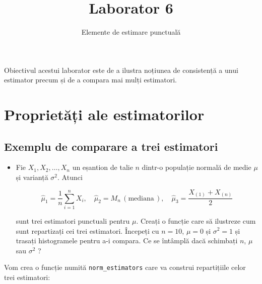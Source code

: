 \documentclass[
]{article}
\title{Laborator 6}
\subtitle{Elemente de estimare punctuală}
\author{}
\date{\vspace{-2.5em}}
\newenvironment{frshaded*}{%
  \def\FrameCommand{\fboxrule=\FrameRule\fboxsep=\FrameSep \fcolorbox{framecolor}{shadecolor1}}%
  \MakeFramed {\advance\hsize-\width \FrameRestore}}%
{\endMakeFramed}
\newenvironment{rmdblock}[1]
  {\begin{frshaded*}
  \begin{itemize}
  \renewcommand{\labelitemi}{
    \raisebox{-.7\height}[0pt][0pt]{
      {\setkeys{Gin}{width=2em,keepaspectratio}\texttt{[image: images/icons/\#1]}}
    }
  }
  \item
  }
  {
  \end{itemize}
  \end{frshaded*}
  }
\newenvironment{rmdexercise}
  {\begin{rmdblock}{exercise}}
  {\end{rmdblock}}
\begin{document}
\maketitle

\thispagestyle{fancy}

Obiectivul acestui laborator este de a ilustra noțiunea de consistență a
unui estimator precum și de a compara mai mulți estimatori.

\hypertarget{proprietux103ux21bi-ale-estimatorilor}{%
\section{Proprietăți ale
estimatorilor}\label{proprietux103ux21bi-ale-estimatorilor}}

\hypertarget{exemplu-de-comparare-a-trei-estimatori}{%
\subsection{Exemplu de comparare a trei
estimatori}\label{exemplu-de-comparare-a-trei-estimatori}}

\begin{rmdexercise}
Fie \(X_1,X_2,\ldots,X_n\) un eșantion de talie \(n\) dintr-o populație
normală de medie \(\mu\) și varianță \(\sigma^2\). Atunci

\[
  \hat{\mu}_1 = \frac{1}{n}\sum_{i=1}^{n}X_i, \quad \hat{\mu}_2 = M_n\,(\text{mediana}\,), \quad \hat{\mu}_3 = \frac{X_{(1)} + X_{(n)}}{2}
\]

sunt trei estimatori punctuali pentru \(\mu\). Creați o funcție care să
ilustreze cum sunt repartizați cei trei estimatori. Începeți cu
\(n = 10\), \(\mu = 0\) și \(\sigma^2 = 1\) și trasați histogramele
pentru a-i compara. Ce se întâmplă dacă schimbați \(n\), \(\mu\) sau
\(\sigma^2\) ?
\end{rmdexercise}

Vom crea o funcție numită \texttt{norm\_estimators} care va construi
repartițiile celor trei estimatori:
\end{document}
